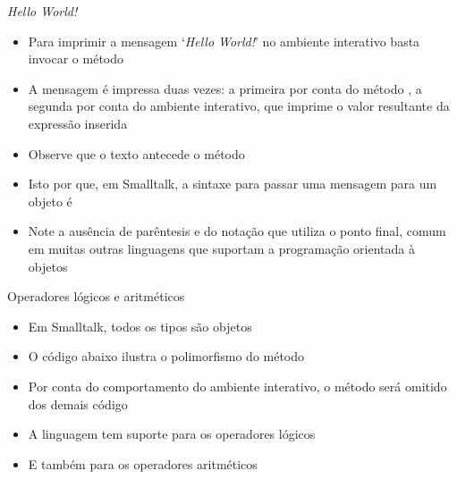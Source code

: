 \begin{frame}[fragile]{\it Hello World!}

    \begin{itemize}
        \item Para imprimir a mensagem `\textit{Hello World!}' no ambiente interativo basta
            invocar o método 


        \item A mensagem é impressa duas vezes: a primeira por conta do método 
            , a segunda por conta do ambiente interativo, que imprime
            o valor resultante da expressão inserida

        \item Observe que o texto antecede o método

        \item Isto por que, em Smalltalk, a sintaxe para passar uma mensagem para um objeto é


        \item Note a ausência de parêntesis e do notação que utiliza o ponto final, comum em
            muitas outras linguagens que suportam a programação orientada à objetos
    \end{itemize}

\end{frame}

\begin{frame}[fragile]{Operadores lógicos e aritméticos}

    \begin{itemize}
        \item Em Smalltalk, todos os tipos são objetos

        \item O código abaixo ilustra o polimorfismo do método 


        \item Por conta do comportamento do ambiente interativo, o método 
            será omitido dos demais código

        \item A linguagem tem suporte para os operadores lógicos


        \item E também para os operadores aritméticos

    \end{itemize}

\end{frame}

